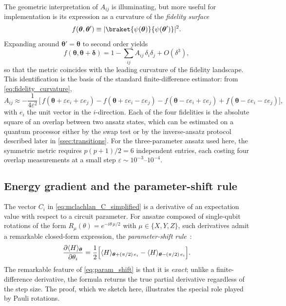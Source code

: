 The geometric interpretation of $A_{ij}$ is illuminating, but more useful
for implementation is its expression as a curvature of the
\emph{fidelity surface}
\begin{equation}
  \label{eq:fidelity_func}
  f(\bm{\theta}, \bm{\theta}')
  \equiv |\braket{\psi(\bm{\theta})}{\psi(\bm{\theta}')}|^{2}.
\end{equation}
Expanding around $\bm{\theta}' = \bm{\theta}$ to second order yields
\begin{equation}
  \label{eq:fidelity_curvature}
  f(\bm{\theta}, \bm{\theta} + \bm{\delta})
  = 1 - \sum_{ij} A_{ij}\,\delta_i\delta_j + O(\delta^{3}),
\end{equation}
so that the metric coincides with the leading curvature of the fidelity
landscape. This identification is the basis of the standard
finite-difference estimator: from \cref{eq:fidelity_curvature},
\begin{equation}
  \label{eq:metric_fd}
  A_{ij} \approx -\frac{1}{4\varepsilon^{2}}\,
  \bigl[\,
    f(\bm{\theta} + \varepsilon e_i + \varepsilon e_j)
    - f(\bm{\theta} + \varepsilon e_i - \varepsilon e_j)
    - f(\bm{\theta} - \varepsilon e_i + \varepsilon e_j)
    + f(\bm{\theta} - \varepsilon e_i - \varepsilon e_j)
  \bigr],
\end{equation}
with $e_i$ the unit vector in the $i$-direction. Each of the four
fidelities is the absolute square of an overlap between two ansatz
states, which can be estimated on a quantum processor either by the swap
test or by the inverse-ansatz protocol described later in
\cref{ssec:transitions}. For the three-parameter ansatz used here, the
symmetric metric requires $p(p+1)/2 = 6$ independent entries, each
costing four overlap measurements at a small step
$\varepsilon \sim 10^{-3}$--$10^{-4}$.

\subsection{Energy gradient and the parameter-shift rule}
\label{ssec:parameter_shift}

The vector $C_i$ in \cref{eq:mclachlan_C_simplified} is a derivative of
an expectation value with respect to a circuit parameter. For ansatze
composed of single-qubit rotations of the form
$R_\mu(\theta) = e^{-i\theta\,\mu/2}$ with $\mu \in \{X,Y,Z\}$, such
derivatives admit a remarkable closed-form expression, the
\emph{parameter-shift rule}~\cite{mitarai2018,schuld2019}:
\begin{equation}
  \label{eq:param_shift}
  \frac{\partial \langle H\rangle_{\bm{\theta}}}{\partial\theta_i}
  =
  \frac{1}{2}\Bigl[
    \langle H\rangle_{\bm{\theta} + (\pi/2)\,e_i}
  - \langle H\rangle_{\bm{\theta} - (\pi/2)\,e_i}
  \Bigr].
\end{equation}
The remarkable feature of \cref{eq:param_shift} is that it is
\emph{exact}; unlike a finite-difference derivative, the formula returns
the true partial derivative regardless of the step size. The proof, which
we sketch here, illustrates the special role played by Pauli rotations.

